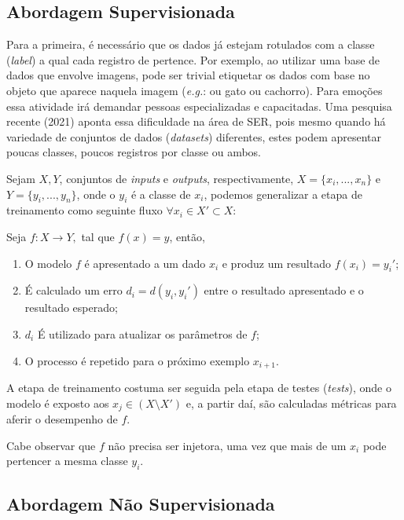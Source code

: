 \subsection{Abordagem Supervisionada}

Para a primeira, é necessário que os dados já estejam rotulados com a classe (\textit{label}) a qual cada registro de pertence. Por exemplo, ao utilizar uma base de dados que envolve imagens, pode ser trivial etiquetar os dados com base no objeto que aparece naquela imagem (\textit{e.g.}: ou gato ou cachorro). Para emoções essa atividade irá demandar pessoas especializadas e capacitadas. Uma pesquisa~\cite{32} recente (2021) aponta essa dificuldade na área de \acrshort{SER}, pois mesmo quando há variedade de conjuntos de dados (\textit{datasets}) diferentes, estes podem apresentar poucas classes, poucos registros por classe ou ambos.

Sejam $X, Y$, conjuntos de \textit{inputs} e \textit{outputs}, respectivamente, $X=\{x_i, ..., x_n\}$ e $Y=\{y_i, ..., y_n\}$, onde o $y_i$ é a classe de $x_i$, podemos generalizar a etapa de treinamento como seguinte fluxo $\forall x_i \in X' \subset X$:

Seja $f: X \rightarrow Y,$ tal que $f(x) = y$, então,

\begin{enumerate}
    \item O modelo $f$ é apresentado a um dado $x_i$ e produz um resultado $f(x_i) = y_i'$;
    \item É calculado um erro $d_i = d(y_i, y_i')$ entre o resultado apresentado e o resultado esperado;
    \item $d_i$ É utilizado para atualizar os parâmetros de $f$;
    \item O processo é repetido para o próximo exemplo $x_{i+1}$.
\end{enumerate}

A etapa de treinamento costuma ser seguida pela etapa de testes (\textit{tests}), onde o modelo é exposto aos $x_j \in (X \setminus X')$ e, a partir daí, são calculadas métricas para aferir o desempenho de $f$.

Cabe observar que $f$ não precisa ser injetora, uma vez que mais de um $x_i$ pode pertencer a mesma classe $y_i$.

\subsection{Abordagem Não Supervisionada}

